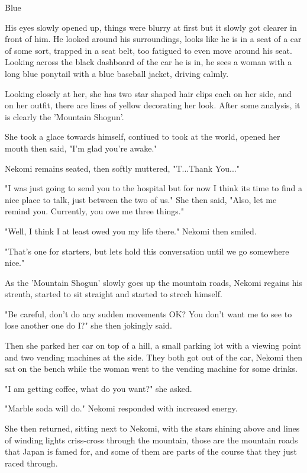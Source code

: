 \h{Blue}

His eyes slowly opened up, things were blurry at first but it slowly got clearer in front of him. He looked around his surroundings, looks like he is in a seat of a car of some sort, trapped in a seat belt, too fatigued to even move around his seat. Looking across the black dashboard of the car he is in, he sees a woman with a long blue ponytail with a blue baseball jacket, driving calmly.

Looking closely at her, she has two star shaped hair clips each on her side, and on her outfit, there are lines of yellow decorating her look. After some analysis, it is clearly the 'Mountain Shogun'.

She took a glace towards himself, contiued to took at the world, opened her mouth then said, "I'm glad you're awake."

Nekomi remains seated, then softly muttered, "T...Thank You..."

"I was just going to send you to the hospital but for now I think its time to find a nice place to talk, just between the two of us." She then said, "Also, let me remind you. Currently, you owe me three things."

"Well, I think I at least owed you my life there." Nekomi then smiled.

"That's one for starters, but lets hold this conversation until we go somewhere nice."

As the 'Mountain Shogun' slowly goes up the mountain roads, Nekomi regains his strenth, started to sit straight and started to strech himself.

"Be careful, don't do any sudden movements OK? You don't want me to see to lose another one do I?" she then jokingly said.

Then she parked her car on top of a hill, a small parking lot with a viewing point and two vending machines at the side. They both got out of the car, Nekomi then sat on the bench while the woman went to the vending machine for some drinks.

"I am getting coffee, what do you want?" she asked.

"Marble soda will do." Nekomi responded with increased energy.

She then returned, sitting next to Nekomi, with the stars shining above and lines of winding lights criss-cross through the mountain, those are the mountain roads that Japan is famed for, and some of them are parts of the course that they just raced through.

